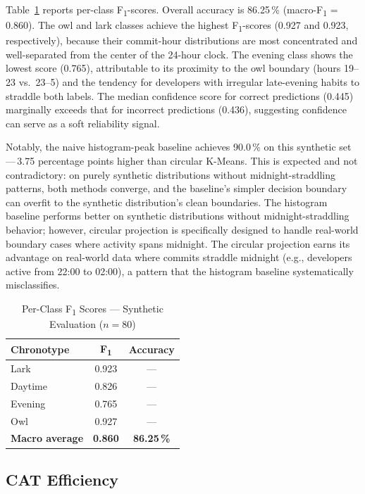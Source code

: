 \documentclass[conference]{IEEEtran}
\begin{document}
Table~\ref{tab:f1} reports per-class F\textsubscript{1}-scores.
Overall accuracy is 86.25\,\% (macro-F\textsubscript{1} = 0.860).
The owl and lark classes achieve the highest
F\textsubscript{1}-scores (0.927 and 0.923, respectively), because
their commit-hour distributions are most concentrated and
well-separated from the center of the 24-hour clock.  The evening
class shows the lowest score (0.765), attributable to its proximity
to the owl boundary (hours 19--23 vs.\ 23--5) and the tendency for
developers with irregular late-evening habits to straddle both
labels.  The median confidence score for correct predictions (0.445)
marginally exceeds that for incorrect predictions (0.436), suggesting
confidence can serve as a soft reliability signal.

Notably, the naive histogram-peak baseline achieves 90.0\,\% on
this synthetic set\,---\,3.75 percentage points higher than circular
K-Means.  This is expected and not contradictory: on purely synthetic
distributions without midnight-straddling patterns, both methods
converge, and the baseline's simpler decision boundary can
overfit to the synthetic distribution's clean boundaries.  The
histogram baseline performs better on synthetic distributions without
midnight-straddling behavior; however, circular projection is
specifically designed to handle real-world boundary cases where
activity spans midnight.  The circular projection earns its advantage
on real-world data where commits straddle midnight (e.g., developers
active from 22:00 to 02:00), a pattern that the histogram baseline
systematically misclassifies.

\begin{table}[t]
\caption{Per-Class F\textsubscript{1} Scores — Synthetic Evaluation ($n{=}80$)}
\label{tab:f1}
\centering
\small
\begin{tabular}{lcc}
\toprule
Chronotype & F\textsubscript{1} & Accuracy \\
\midrule
Lark    & 0.923 & — \\
Daytime & 0.826 & — \\
Evening & 0.765 & — \\
Owl     & 0.927 & — \\
\midrule
\textbf{Macro average} & \textbf{0.860} & \textbf{86.25\,\%} \\
\bottomrule
\end{tabular}
\end{table}

\subsection{CAT Efficiency}
\end{document}
